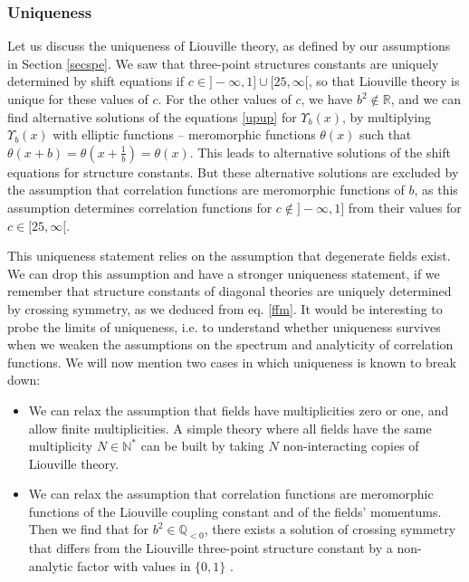\documentclass[12pt, a4paper, notitlepage, twoside]{report}
\numberwithin{equation}{section}
\theoremstyle{break}
\begin{document}
\subsubsection{Uniqueness}

Let us discuss the uniqueness of Liouville theory, as defined by our assumptions in Section \ref{secspe}. 
We saw that three-point structures constants are uniquely determined by shift equations if $c\in ]-\infty, 1] \cup [25,\infty[$, so that Liouville theory is unique for these values of $c$. 
For the other values of $c$, we have $b^2\notin\mathbb{R}$, and we can find alternative solutions of the equations \eqref{upup} for $\Upsilon_b(x)$, by multiplying $\Upsilon_b(x)$ with elliptic functions -- meromorphic functions $\theta(x)$ such that $\theta(x+b)=\theta(x+\frac{1}{b}) = \theta(x)$.
This leads to alternative solutions of the shift equations for structure constants.
But these alternative solutions are excluded by the assumption that correlation functions are meromorphic functions of $b$, as this assumption determines correlation functions for $c\notin ]-\infty, 1]$ from their values for $c\in [25,\infty[$.

This uniqueness statement relies on the assumption that degenerate fields exist. We can drop this assumption and have a stronger uniqueness statement, if we remember that structure constants of diagonal theories are uniquely determined by crossing symmetry, as we deduced from eq. \eqref{ffm}. It would be interesting to probe the limits of uniqueness, i.e. to understand whether uniqueness survives when we weaken the assumptions on the spectrum and analyticity of correlation functions. We will now mention two cases in which uniqueness is known to break down:
\begin{itemize}
 \item We can relax the assumption that fields have multiplicities zero or one, and allow finite multiplicities. A simple theory where all fields have the same multiplicity $N\in\mathbb{N}^*$ can be built by taking $N$ non-interacting copies of Liouville theory.
 \item We can relax the assumption that correlation functions are meromorphic functions of the Liouville coupling constant and of the fields' momentums. Then we find that for $b^2\in \mathbb{Q}_{<0}$, there exists a solution of crossing symmetry that differs from the Liouville three-point structure constant by a non-analytic factor with values in $\{0,1\}$ \cite{rs15}.
\end{itemize}
\end{document}
